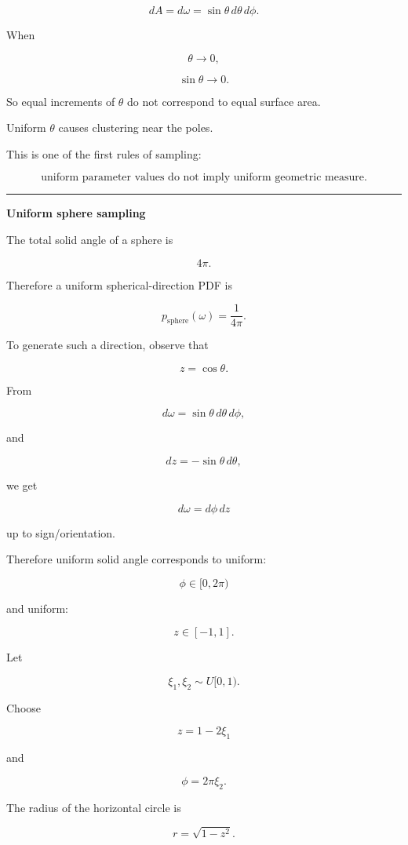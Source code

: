 \[
dA=d\omega
=
\sin\theta\,d\theta\,d\phi.
\]

When

\[
\theta\rightarrow0,
\]

\[
\sin\theta\rightarrow0.
\]

So equal increments of \(\theta\) do not correspond to equal surface area.

Uniform \(\theta\) causes clustering near the poles.

This is one of the first rules of sampling:

\[
\boxed{
\text{uniform parameter values do not imply uniform geometric measure.}
}
\]

\begin{center}\rule{0.5\linewidth}{0.5pt}\end{center}

\textbf{Uniform sphere sampling}

The total solid angle of a sphere is

\[
4\pi.
\]

Therefore a uniform spherical-direction PDF is

\[
\boxed{
p_{\text{sphere}}(\omega)
=
\frac{1}{4\pi}.
}
\]

To generate such a direction, observe that

\[
z=\cos\theta.
\]

From

\[
d\omega
=
\sin\theta\,d\theta\,d\phi,
\]

and

\[
dz=-\sin\theta\,d\theta,
\]

we get

\[
d\omega=d\phi\,dz
\]

up to sign/orientation.

Therefore uniform solid angle corresponds to uniform:

\[
\phi\in[0,2\pi)
\]

and uniform:

\[
z\in[-1,1].
\]

Let

\[
\xi_1,\xi_2\sim U[0,1).
\]

Choose

\[
\boxed{
z=1-2\xi_1
}
\]

and

\[
\boxed{
\phi=2\pi\xi_2.
}
\]

The radius of the horizontal circle is

\[
r=\sqrt{1-z^2}.
\]


